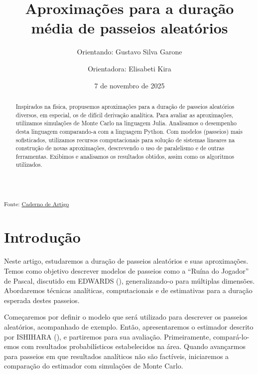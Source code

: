 \documentclass[
  brazilian,
  12pt,
]{article}
\title{Aproximações para a duração média de passeios aleatórios}
\author{Orientando: Gustavo Silva Garone \and Orientadora: Elisabeti
Kira}
\date{7 de novembro de 2025}
\theoremstyle{definition}
\theoremstyle{definition}
\theoremstyle{remark}
\begin{document}
\maketitle
\begin{abstract}
Inspirados na física, propusemos aproximações para a duração de passeios
aleatórios diversos, em especial, os de difícil derivação analítica.
Para avaliar as aproximações, utilizamos simulações de Monte Carlo na
linguagem Julia. Analisamos o desempenho desta linguagem comparando-a
com a linguagem Python. Com modelos (passeios) mais sofisticados,
utilizamos recursos computacionais para solução de sistemas lineares na
construção de novas aproximações, descrevendo o uso de paralelismo e de
outras ferramentas. Exibimos e analisamos os resultados obtidos, assim
como os algoritmos utilizados.
\end{abstract}

\renewcommand{\Return}{\State \textbf{return}~}
\newcommand{\Print}{\State \textbf{print}~}
\newcommand{\Break}{\State \textbf{break}}
\newcommand{\Continue}{\State \textbf{continue}}
\newcommand{\True}{\textbf{true}}
\newcommand{\False}{\textbf{false}}
\renewcommand{\And}{\textbf{and}~}
\newcommand{\Or}{\textbf{or}~}
\renewcommand{\Not}{\textbf{not}~}
\newcommand{\To}{\textbf{to}~}
\newcommand{\DownTo}{\textbf{downto}~}



\textsubscript{Fonte:
\href{https://GustavoGarone.github.io/Estimador-de-Passeio/Estimando_Passeios_Aleatorios_Garone_2025.qmd.html}{Caderno
de Artigo}}

\section{Introdução}\label{introduuxe7uxe3o}

Neste artigo, estudaremos a duração de passeios aleatórios e suas
aproximações. Temos como objetivo descrever modelos de passeios como a
``Ruína do Jogador'' de Pascal, discutido em EDWARDS
(), generalizando-o para
múltiplas dimensões. Abordaremos técnicas analíticas, computacionais e
de estimativas para a duração esperada destes passeios.

Começaremos por definir o modelo que será utilizado para descrever os
passeios aleatórios, acompanhado de exemplo. Então, apresentaremos o
estimador descrito por ISHIHARA (),
e partiremos para sua avaliação. Primeiramente, compará-lo-emos com
resultados probabilísticos estabelecidos na área. Quando avançarmos para
passeios em que resultados analíticos não são factíveis, iniciaremos a
comparação do estimador com simulações de Monte Carlo.
\end{document}
